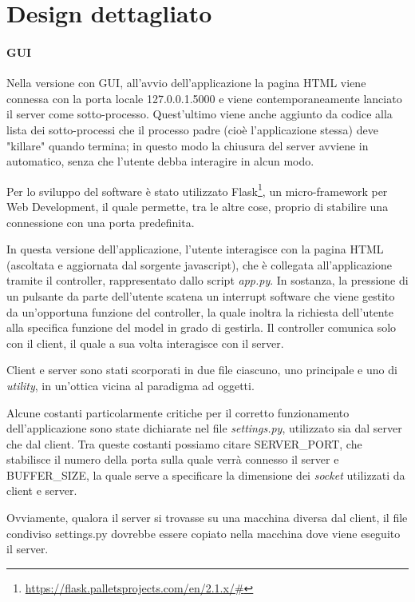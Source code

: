 \documentclass[a4paper,12pt]{report}
\begin{document}
\section{Design dettagliato}

\paragraph{GUI}
Nella versione con GUI, all'avvio dell'applicazione la pagina HTML viene connessa con la porta locale 127.0.0.1.5000 e viene contemporaneamente lanciato il server come sotto-processo. Quest'ultimo viene anche aggiunto da codice alla lista dei sotto-processi che il processo padre (cioè l'applicazione stessa) deve "killare" quando termina; in questo modo la chiusura del server avviene in automatico, senza che l'utente debba interagire in alcun modo.

Per lo sviluppo del software è stato utilizzato Flask\footnote{\url{https://flask.palletsprojects.com/en/2.1.x/#}}, un micro-framework per Web Development, il quale permette, tra le altre cose, proprio di stabilire una connessione con una porta predefinita.

In questa versione dell'applicazione, l'utente interagisce con la pagina HTML (ascoltata e aggiornata dal sorgente javascript), che è collegata all'applicazione tramite il controller, rappresentato dallo script \textit{app.py}. In sostanza, la pressione di un pulsante da parte dell'utente scatena un interrupt software che viene gestito da un'opportuna funzione del controller, la quale inoltra la richiesta dell'utente alla specifica funzione del model in grado di gestirla. 
Il controller comunica solo con il client, il quale a sua volta interagisce con il server. 

Client e server sono stati scorporati in due file ciascuno, uno principale e uno di \textit{utility}, in un'ottica vicina al paradigma ad oggetti.

Alcune costanti particolarmente critiche per il corretto funzionamento dell'applicazione sono state dichiarate nel file \textit{settings.py}, utilizzato sia dal server che dal client. Tra queste costanti possiamo citare SERVER\_PORT, che stabilisce il numero della porta sulla quale verrà connesso il server e BUFFER\_SIZE, la quale serve a specificare la dimensione dei \textit{socket} utilizzati da client e server.

Ovviamente, qualora il server si trovasse su una macchina diversa dal client, il file condiviso settings.py dovrebbe essere copiato nella macchina dove viene eseguito il server.
\end{document}

